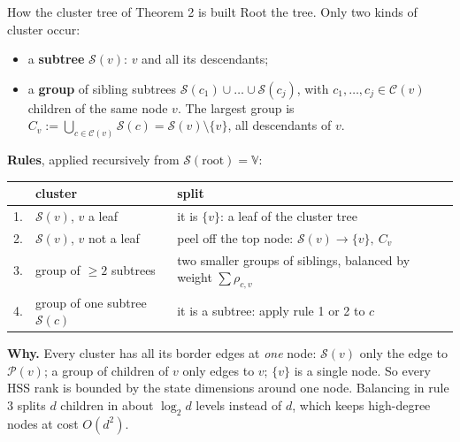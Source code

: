 \documentclass[aspectratio=169,11pt]{beamer}
\newcommand{\Par}{\mathcal{P}}            %
\begin{document}
\begin{frame}{How the cluster tree of Theorem 2 is built}
\footnotesize
Root the tree. Only two kinds of cluster occur:
\begin{itemize}
\item a \textbf{subtree} $\mathcal{S}(v)$: $v$ and all its descendants;
\item a \textbf{group} of sibling subtrees $\mathcal{S}(c_1)\cup\dots\cup\mathcal{S}(c_j)$, with
  $c_1,\dots,c_j\in\mathcal{C}(v)$ children of the same node $v$. The largest group is
  $C_v:=\bigcup_{c\in\mathcal{C}(v)}\mathcal{S}(c)=\mathcal{S}(v)\setminus\{v\}$, all descendants of $v$.
\end{itemize}

\vspace{1mm}
\textbf{Rules}, applied recursively from $\mathcal{S}(\text{root})=\mathbb{V}$:

\vspace{1mm}
\renewcommand{\arraystretch}{1.25}
\begin{tabular}{@{}lll@{}}
\toprule
& cluster & split \\
\midrule
1. & $\mathcal{S}(v)$, $v$ a leaf & it is $\{v\}$: a leaf of the cluster tree \\
2. & $\mathcal{S}(v)$, $v$ not a leaf & peel off the top node: $\mathcal{S}(v)\to\{v\},\ C_v$ \\
3. & group of $\geq2$ subtrees & two smaller groups of siblings, balanced by weight $\sum\rho_{c,v}$ \\
4. & group of one subtree $\mathcal{S}(c)$ & it is a subtree: apply rule 1 or 2 to $c$ \\
\bottomrule
\end{tabular}

\vspace{2mm}
\textbf{Why.} Every cluster has all its border edges at \emph{one} node: $\mathcal{S}(v)$ only the edge to
$\Par(v)$; a group of children of $v$ only edges to $v$; $\{v\}$ is a single node. So every HSS rank is bounded by
the state dimensions around one node. Balancing in rule 3 splits $d$ children in about $\log_2 d$ levels instead of
$d$, which keeps high-degree nodes at cost $O(d^2)$.
\end{frame}
\end{document}
